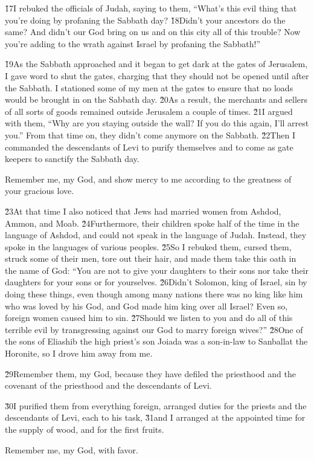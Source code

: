 \v{17}I rebuked the officials of Judah, saying to them, ``What's this evil thing that you're doing by profaning the Sabbath day? \v{18}Didn't your ancestors do the same? And didn't our God bring on us and on this city all of this trouble? Now you're adding to the wrath against Israel by profaning the Sabbath!''

\v{19}As the Sabbath approached and it began to get dark at the gates of Jerusalem, I gave word to shut the gates, charging that they should not be opened until after the Sabbath. I stationed some of my men at the gates to ensure that no loads would be brought in on the Sabbath day. \v{20}As a result, the merchants and sellers of all sorts of goods remained outside Jerusalem a couple of times. \v{21}I argued with them, ``Why are you staying outside the wall? If you do this again, I'll arrest you.'' From that time on, they didn't come anymore on the Sabbath. \v{22}Then I commanded the descendants of Levi to purify themselves and to come as gate keepers to sanctify the Sabbath day.

Remember me, my God, and show mercy to me according to the greatness of your gracious love.

\v{23}At that time I also noticed that Jews had married women from Ashdod, Ammon, and Moab. \v{24}Furthermore, their children spoke half of the time in the language of Ashdod, and could not speak in the language of Judah. Instead, they spoke in the languages of various peoples. \v{25}So I rebuked them, cursed them, struck some of their men, tore out their hair, and made them take this oath in the name of God: ``You are not to give your daughters to their sons nor take their daughters for your sons or for yourselves. \v{26}Didn't Solomon, king of Israel, sin by doing these things, even though among many nations there was no king like him who was loved by his God, and God made him king over all Israel? Even so, foreign women caused him to sin. \v{27}Should we listen to you and do all of this terrible evil by transgressing against our God to marry foreign wives?'' \v{28}One of the sons of Eliashib the high priest's son Joiada was a son-in-law to Sanballat the Horonite, so I drove him away from me.

\v{29}Remember them, my God, because they have defiled the priesthood and the covenant of the priesthood and the descendants of Levi.

\v{30}I purified them from everything foreign, arranged duties for the priests and the descendants of Levi, each to his task, \v{31}and I arranged at the appointed time for the supply of wood, and for the first fruits.

Remember me, my God, with favor.
